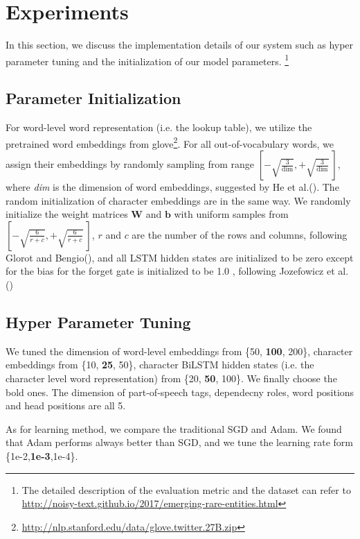 \section{Experiments}
\label{sec:eval}
In this section, we discuss the implementation details of our system such as hyper parameter tuning and the initialization of our model parameters. 
\footnote{The detailed description of the evaluation metric and the dataset can refer to \url{http://noisy-text.github.io/2017/emerging-rare-entities.html}}
\subsection{Parameter Initialization}
For word-level word representation (i.e. the lookup table), 
we utilize the pretrained word embeddings from glove\footnote{\url{http://nlp.stanford.edu/data/glove.twitter.27B.zip}}.
For all out-of-vocabulary words, we assign their embeddings by randomly sampling from range $\left[-\sqrt{\frac{3}{\text{dim}}}, +\sqrt{\frac{3}{\text{dim}}}~\right]$, where \textit{dim} is the dimension of word embeddings, suggested by He et al.(\citeyear{DBLP:conf/iccv/HeZRS15}). The random initialization of character embeddings are in the same way.
We randomly initialize the weight matrices $\mathbf{W}$ and $\mathbf{b}$ with uniform samples from 
$\left[-\sqrt{\frac{6}{r+c}}, +\sqrt{\frac{6}{r+c}}~\right]$, 
$r$ and $c$ are the number of the rows and columns, following Glorot and Bengio(\citeyear{DBLP:journals/jmlr/GlorotB10}), and all LSTM hidden states are initialized to be zero except for the bias for the forget gate is initialized to be 1.0 , following Jozefowicz et al.(\citeyear{DBLP:conf/icml/JozefowiczZS15}) 


\subsection{Hyper Parameter Tuning}
We tuned the dimension of word-level embeddings from \{50, \textbf{100}, 200\}, character embeddings from \{10, \textbf{25}, 50\}, character BiLSTM hidden states (i.e. the character level word representation)  from  \{20, \textbf{50}, 100\}. 
We finally choose the bold ones.
The dimension of part-of-speech tags, dependecny roles, word positions and head positions are all 5.

As for learning method, we compare the traditional SGD and Adam\cite{}.
We found that Adam performs always better than SGD, and we tune the learning rate form \{1e-2,\textbf{1e-3},1e-4\}.

